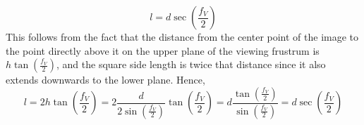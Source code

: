 \documentclass[onecolumn]{article} %
\newcommand{\lp}{\left(}%
\newcommand{\rp}{\right)}%
\begin{document}
\[ l= d\sec\lp\frac{f_{V}}{2}\rp \]
This follows from the fact that the distance from the center point of the image to the point directly above it on the upper plane of the viewing frustrum is $h \tan \lp \frac{f_{V}}{2} \rp$, and the square side length is twice that distance since it also extends downwards to the lower plane. Hence, \\
\[ l = 2h \tan \lp \frac{f_{V}}{2} \rp = 2\frac{d}{2\sin\lp\frac{f_{V}}{2}\rp} \tan \lp \frac{f_{V}}{2} \rp = d \frac{\tan \lp \frac{f_{V}}{2} \rp}{\sin \lp \frac{f_{V}}{2} \rp} = d\sec\lp\frac{f_{V}}{2}\rp \]
\end{document}
